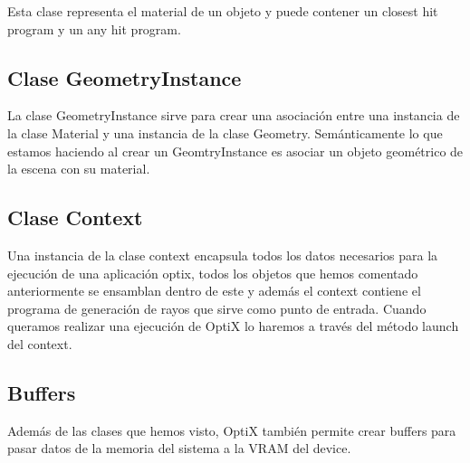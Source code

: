 Esta clase representa el material de un objeto y puede contener un closest hit program y un any hit program.

\subsection{Clase GeometryInstance}

La clase GeometryInstance sirve para crear una asociación entre una instancia de la clase Material y una instancia de la clase Geometry. Semánticamente lo que estamos haciendo al crear un GeomtryInstance es asociar un objeto geométrico de la escena con su material.

\subsection{Clase Context}

Una instancia de la clase context encapsula todos los datos necesarios para la ejecución de una aplicación optix, todos los objetos que hemos comentado anteriormente se ensamblan dentro de este y además el context contiene el programa de generación de rayos que sirve como punto de entrada. Cuando queramos realizar una ejecución de OptiX lo haremos a través del método launch del context.

\subsection{Buffers}

Además de las clases que hemos visto, OptiX también permite crear buffers para pasar datos de la memoria del sistema a la VRAM del device.
